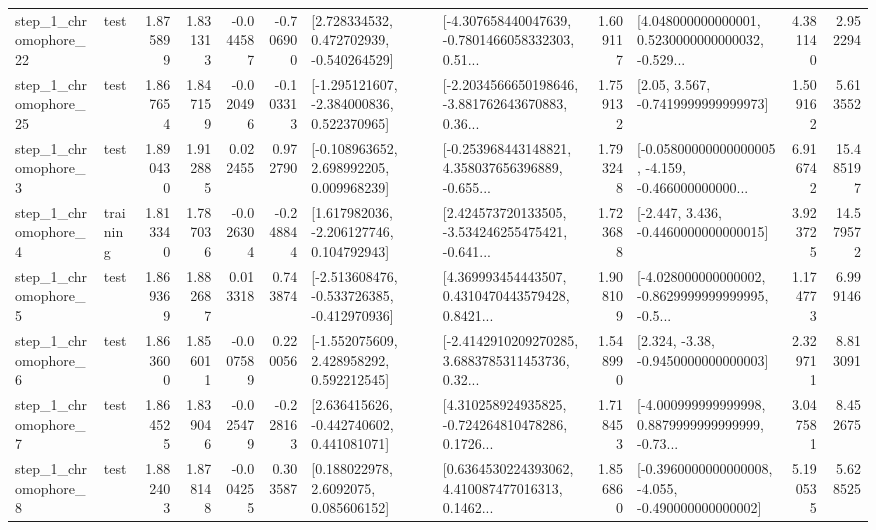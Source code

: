 \begin{tabular}{llrrrrllrlrr}
    step\_1\_chromophore\_22 &      test &      1.875899 &    1.831313 &     -0.044587 & -0.706900 &    [2.728334532, 0.472702939, -0.540264529] &  [-4.307658440047639, -0.7801466058332303, 0.51... &       1.609117 &  [4.048000000000001, 0.5230000000000032, -0.529... &            4.381140 &          2.952294 \\
    step\_1\_chromophore\_25 &      test &      1.867654 &    1.847159 &     -0.020496 & -0.103313 &   [-1.295121607, -2.384000836, 0.522370965] &  [-2.2034566650198646, -3.881762643670883, 0.36... &       1.759132 &                 [2.05, 3.567, -0.7419999999999973] &            1.509162 &          5.613552 \\
     step\_1\_chromophore\_3 &      test &      1.890430 &    1.912885 &      0.022455 &  0.972790 &    [-0.108963652, 2.698992205, 0.009968239] &  [-0.253968443148821, 4.358037656396889, -0.655... &       1.793248 &  [-0.05800000000000005, -4.159, -0.466000000000... &            6.916742 &         15.485197 \\
     step\_1\_chromophore\_4 &  training &      1.813340 &    1.787036 &     -0.026304 & -0.248844 &    [1.617982036, -2.206127746, 0.104792943] &  [2.424573720133505, -3.534246255475421, -0.641... &       1.723688 &               [-2.447, 3.436, -0.4460000000000015] &            3.923725 &         14.579572 \\
     step\_1\_chromophore\_5 &      test &      1.869369 &    1.882687 &      0.013318 &  0.743874 &  [-2.513608476, -0.533726385, -0.412970936] &  [4.369993454443507, 0.4310470443579428, 0.8421... &       1.908109 &  [-4.028000000000002, -0.8629999999999995, -0.5... &            1.174773 &          6.999146 \\
     step\_1\_chromophore\_6 &      test &      1.863600 &    1.856011 &     -0.007589 &  0.220056 &    [-1.552075609, 2.428958292, 0.592212545] &  [-2.4142910209270285, 3.6883785311453736, 0.32... &       1.548990 &                [2.324, -3.38, -0.9450000000000003] &            2.329711 &          8.813091 \\
     step\_1\_chromophore\_7 &      test &      1.864525 &    1.839046 &     -0.025479 & -0.228163 &    [2.636415626, -0.442740602, 0.441081071] &  [4.310258924935825, -0.724264810478286, 0.1726... &       1.718453 &  [-4.000999999999998, 0.8879999999999999, -0.73... &            3.047581 &          8.452675 \\
     step\_1\_chromophore\_8 &      test &      1.882403 &    1.878148 &     -0.004255 &  0.303587 &       [0.188022978, 2.6092075, 0.085606152] &  [0.6364530224393062, 4.410087477016313, 0.1462... &       1.856860 &  [-0.3960000000000008, -4.055, -0.490000000000002] &            5.190535 &          5.628525 \\

\end{tabular}
